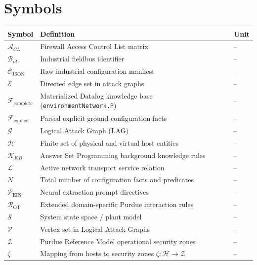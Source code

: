 \documentclass[target=mst,aauheader=aics,style=]{thud}
\begin{document}
\section*{Symbols}
\begin{longtable}{p{3.0cm}p{8.5cm}p{1.5cm}}
    \toprule
    \textbf{Symbol} & \textbf{Definition} & \textbf{Unit} \\
    \midrule
    \endhead
    $\mathcal{A}_{CL}$ & Firewall Access Control List matrix & -- \\
    $\mathcal{B}_{id}$ & Industrial fieldbus identifier & -- \\
    $\mathcal{C}_{\text{JSON}}$ & Raw industrial configuration manifest & -- \\
    $\mathcal{E}$ & Directed edge set in attack graphs & -- \\
    $\mathcal{F}_{\text{complete}}$ & Materialized Datalog knowledge base (\texttt{environmentNetwork.P}) & -- \\
    $\mathcal{F}_{\text{explicit}}$ & Parsed explicit ground configuration facts & -- \\
    $\mathcal{G}$ & Logical Attack Graph (LAG) & -- \\
    $\mathcal{H}$ & Finite set of physical and virtual host entities & -- \\
    $\mathcal{K}_{KB}$ & Answer Set Programming background knowledge rules & -- \\
    $\mathcal{L}$ & Active network transport service relation & -- \\
    $N$ & Total number of configuration facts and predicates & -- \\
    $\mathcal{P}_{\text{EIN}}$ & Neural extraction prompt directives & -- \\
    $\mathcal{R}_{\text{OT}}$ & Extended domain-specific Purdue interaction rules & -- \\
    $\mathcal{S}$ & System state space / plant model & -- \\
    $\mathcal{V}$ & Vertex set in Logical Attack Graphs & -- \\
    $\mathcal{Z}$ & Purdue Reference Model operational security zones & -- \\
    $\zeta$ & Mapping from hosts to security zones $\zeta : \mathcal{H} \to \mathcal{Z}$ & -- \\
    \bottomrule
\end{longtable}

\mainmatter

\end{document}
